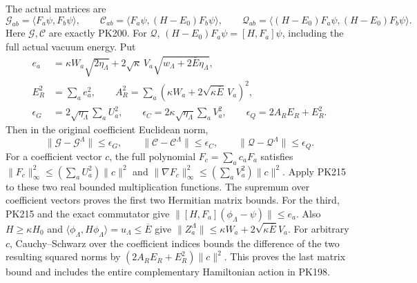 \documentclass[11pt]{article}
\begin{document}
The actual matrices are
\[
 \mathcal G_{ab}=\langle F_a\psi,F_b\psi\rangle,\qquad
 \mathcal C_{ab}=\langle F_a\psi,(H-E_0)F_b\psi\rangle,\qquad
 \mathcal Q_{ab}
   =\langle(H-E_0)F_a\psi,(H-E_0)F_b\psi\rangle.
 \tag{PK219}
\]
Here \(\mathcal G,\mathcal C\) are exactly PK200. For \(\mathcal Q\),
\((H-E_0)F_a\psi=[H,F_a]\psi\), including the full actual
vacuum energy. Put
\[
 \begin{split}
 e_a&=\kappa W_a\sqrt{2\eta_\Lambda}
       +2\sqrt{\kappa}\,V_a
                    \sqrt{w_\Lambda+2\overline E\eta_\Lambda},\\
 E_R^2&=\sum_a e_a^2,\qquad
 A_R^2=\sum_a
       \left(\kappa W_a+2\sqrt{\kappa\overline E}\,V_a\right)^2,\\
 \epsilon_G&=2\sqrt{\eta_\Lambda}\sum_aU_a^2,\qquad
 \epsilon_C=2\kappa\sqrt{\eta_\Lambda}\sum_aV_a^2,\qquad
 \epsilon_Q=2A_RE_R+E_R^2 .
 \end{split}\tag{PK220}
\]
Then in the original coefficient Euclidean norm,
\[
 \|\mathcal G-\mathcal G^\Lambda\|\le\epsilon_G,\qquad
 \|\mathcal C-\mathcal C^\Lambda\|\le\epsilon_C,\qquad
 \|\mathcal Q-\mathcal Q^\Lambda\|\le\epsilon_Q .
 \tag{PK221}
\]
For a coefficient vector \(c\), the full polynomial
\(F_c=\sum_ac_aF_a\) satisfies
\(\|F_c\|_\infty^2\le(\sum_aU_a^2)\|c\|^2\) and
\(\|\nabla F_c\|_\infty^2\le(\sum_aV_a^2)\|c\|^2\).
Apply PK215 to these two real bounded multiplication
functions. The supremum over coefficient vectors proves
the first two Hermitian matrix bounds.
For the third, PK215 and the exact commutator give
\(\|[H,F_a](\phi_\Lambda-\psi)\|\le e_a\).
Also \(H\ge\kappa H_0\) and
\(\langle\phi_\Lambda,H\phi_\Lambda\rangle
=u_\Lambda\le\overline E\) give
\(\|Z^\Lambda_a\|\le\kappa W_a+
2\sqrt{\kappa\overline E}V_a\).
For arbitrary \(c\), Cauchy--Schwarz over the coefficient
indices bounds the difference of the two resulting squared
norms by \((2A_RE_R+E_R^2)\|c\|^2\). This proves the last
matrix bound and includes the entire complementary
Hamiltonian action in PK198.
\end{document}
